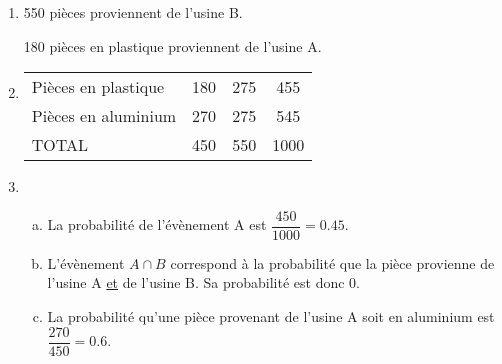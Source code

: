 \documentclass[xcolor=table]{beamer}
\begin{document}
\begin{frame}
	\begin{enumerate}
		\color{red}
		\item 550 pièces proviennent de l'usine B.

		      180 pièces en plastique proviennent de l'usine A.
		\item \begin{center}
			      \begin{tabular}{l|c|c|c|}
				      \cline{2-4}
				                                                                        & \cellcolor[HTML]{00D2CB}{\color[HTML]{000000} Usine A} & \cellcolor[HTML]{00D2CB}{\color[HTML]{000000} Usine B} & \cellcolor[HTML]{00D2CB}{\color[HTML]{000000} TOTAL} \\ \hline
				      \multicolumn{1}{|l|}{\cellcolor[HTML]{00D2CB}Pièces en plastique} & 180                                                    & 275                                                    & 455                                                  \\ \hline
				      \multicolumn{1}{|l|}{\cellcolor[HTML]{00D2CB}Pièces en aluminium} & 270                                                    & 275                                                    & 545                                                  \\ \hline
				      \multicolumn{1}{|l|}{\cellcolor[HTML]{00D2CB}TOTAL}               & 450                                                    & 550                                                    & 1000                                                 \\ \hline
			      \end{tabular}
		      \end{center}
		\item \begin{enumerate}[a.]
			      \color{red}
			      \item La probabilité de l'évènement A est $\dfrac{450}{1000} = 0.45$.
			      \item L'évènement $A∩B$ correspond à la probabilité que la pièce provienne de l'usine A \uline{et} de l'usine B. Sa probabilité est donc $0$.
			      \item La probabilité qu'une pièce provenant de l'usine A soit en aluminium est $\dfrac{270}{450} = 0.6$.
		      \end{enumerate}
	\end{enumerate}
\end{frame}
\end{document}
